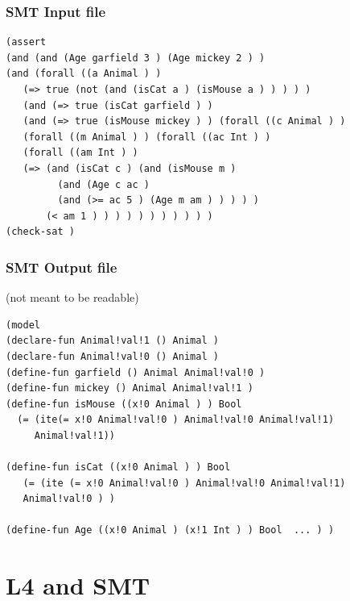 \documentclass{beamer}
\begin{document}
  
\begin{frame}[fragile]\frametitle{SMT Input file}

\begin{verbatim}
(assert 
(and (and (Age garfield 3 ) (Age mickey 2 ) ) 
(and (forall ((a Animal ) ) 
   (=> true (not (and (isCat a ) (isMouse a ) ) ) ) ) 
   (and (=> true (isCat garfield ) ) 
   (and (=> true (isMouse mickey ) ) (forall ((c Animal ) ) 
   (forall ((m Animal ) ) (forall ((ac Int ) ) 
   (forall ((am Int ) ) 
   (=> (and (isCat c ) (and (isMouse m ) 
         (and (Age c ac )
         (and (>= ac 5 ) (Age m am ) ) ) ) ) 
       (< am 1 ) ) ) ) ) ) ) ) ) ) )
(check-sat )
\end{verbatim}

\end{frame}

\begin{frame}[fragile]\frametitle{SMT Output file}

   (not meant to be readable)
  \small
  \begin{verbatim}
(model 
(declare-fun Animal!val!1 () Animal ) 
(declare-fun Animal!val!0 () Animal ) 
(define-fun garfield () Animal Animal!val!0 ) 
(define-fun mickey () Animal Animal!val!1 ) 
(define-fun isMouse ((x!0 Animal ) ) Bool 
  (= (ite(= x!0 Animal!val!0 ) Animal!val!0 Animal!val!1) 
     Animal!val!1)) 

(define-fun isCat ((x!0 Animal ) ) Bool 
   (= (ite (= x!0 Animal!val!0 ) Animal!val!0 Animal!val!1)
   Animal!val!0 ) ) 

(define-fun Age ((x!0 Animal ) (x!1 Int ) ) Bool  ... ) )

\end{verbatim}  
\normalsize
\end{frame}


\section{L4 and SMT}
\end{document}
